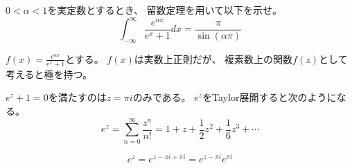 \documentclass[12pt,b5paper]{ltjsarticle}
\begin{document}
\hrulefill

$0< \alpha < 1$を実定数とするとき、
留数定理を用いて以下を示せ。
\begin{equation}
 \int_{-\infty}^{\infty} \frac{e^{\alpha x}}{e^{x}+1}dx
  = \frac{\pi}{\sin{(\alpha\pi)}}
\end{equation}

\dotfill


$f(x)=\frac{e^{\alpha x}}{e^{x}+1}$とする。
$f(x)$は実数上正則だが、
複素数上の関数$f(z)$として考えると極を持つ。

$e^{z}+1=0$を満たすのは$z=\pi i$のみである。
$e^{z}$をTaylor展開すると次のようになる。
\begin{equation}
 e^{z}=\sum_{n=0}^{\infty}\frac{z^n}{n!}
  = 1 + z + \frac{1}{2}z^{2} + \frac{1}{6}z^{3} + \cdots
\end{equation}

\begin{equation}
 e^{z} = e^{z-\pi i + \pi i}
  = e^{z-\pi i} e^{\pi i}
\end{equation}


\hrulefill
\end{document}
